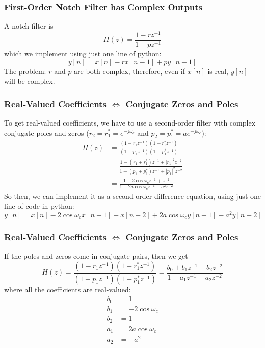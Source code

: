 \documentclass{beamer}
\begin{document}
\begin{frame}
  \frametitle{First-Order Notch Filter has Complex Outputs}

  A notch filter is
  \begin{displaymath}
    H(z)=\frac{1-rz^{-1}}{1-pz^{-1}}
  \end{displaymath}
  which we implement using just one line  of python:
  \begin{displaymath}
    y[n] = x[n]-rx[n-1]+py[n-1]
  \end{displaymath}
  The problem: $r$ and $p$ are both complex, therefore, even if $x[n]$ is real,
  $y[n]$ will be complex.
\end{frame}

\begin{frame}
  \frametitle{Real-Valued Coefficients $\Leftrightarrow$ Conjugate Zeros and Poles}

  To get real-valued coefficients, we have to use a second-order
  filter with complex conjugate poles and zeros
  ($r_2=r_1^*=e^{-j\omega_c}$ and $p_2=p_1^*=ae^{-j\omega_c}$):
  \begin{align*}
    H(z)&=\frac{(1-r_1z^{-1})(1-r_1^*z^{-1})}{(1-p_1z^{-1})(1-p_1^*z^{-1})}\\
    &=\frac{1-(r_1+r_1^*)z^{-1}+|r_1|^2z^{-2}}{1-(p_1+p_1^*)z^{-1}+|p_1|^2 z^{-2}}\\
    &=\frac{1-2\cos\omega_c z^{-1}+ z^{-2}}{1-2a\cos\omega_c z^{-1}+a^2 z^{-2}}
  \end{align*}
  So then, we can implement it as a second-order difference equation, using just one line
  of code in python:
  \begin{displaymath}
    y[n]=x[n]-2\cos\omega_cx[n-1]+x[n-2]+2a\cos\omega_cy[n-1]-a^2y[n-2]
  \end{displaymath}
\end{frame}
\begin{frame}
  \frametitle{Real-Valued Coefficients $\Leftrightarrow$ Conjugate Zeros and Poles}
  If the poles and zeros come in conjugate pairs, then we get
  \begin{displaymath}
    H(z)=\frac{(1-r_1z^{-1})(1-r_1^*z^{-1})}{(1-p_1z^{-1})(1-p_1^*z^{-1})}
    =\frac{b_0+b_1z^{-1}+b_2z^{-2}}{1-a_1z^{-1}-a_2z^{-2}}
  \end{displaymath}
  where all the coefficients are real-valued:
  \begin{align*}
    b_0 &= 1\\
    b_1 &= -2\cos\omega_c\\
    b_2 &= 1\\
    a_1 &= 2a\cos\omega_c\\
    a_2 &= -a^2
  \end{align*}
\end{frame}
\end{document}
